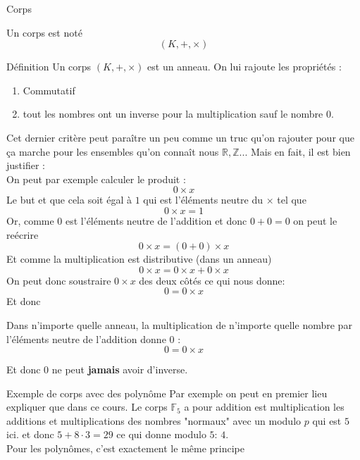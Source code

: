 \begin{parag}{Corps}
    \begin{definition}
        Un corps est noté
    \[(K, +, \times)\]
    \end{definition}
    \begin{subparag}{Définition}
        Un corps $(K, +, \times)$ est un anneau. On lui rajoute les propriétés :
        \begin{enumerate}
            \item Commutatif
            \item tout les nombres ont un inverse pour la multiplication sauf le nombre $0$.
        \end{enumerate}
        Cet dernier critère peut paraître un peu comme un truc qu'on rajouter pour que ça marche pour les ensembles qu'on connaît nous $\mathbb{R}, \mathbb{Z}...$ Mais en fait, il est bien justifier :
        \\
        On peut par exemple calculer le produit : 
        \[ 0 \times x\]
        Le but et que cela soit égal à $1$ qui est l'éléments neutre du $\times$ tel  que
        \[0 \times x = 1\]
        Or, comme $0$ est l'éléments neutre de l'addition et donc $0 + 0 = 0$ on peut le reécrire 
        \[0 \times x = (0 + 0) \times x\]
        Et comme la multiplication est distributive (dans un anneau)
        \[0 \times x = 0\times x + 0\times x\]
        On peut donc soustraire $0 \times x$ des deux côtés ce qui nous donne:
        \[0 = 0 \times x\]
        Et donc
        \begin{lemme}
            Dans n'importe quelle anneau, la multiplication de n'importe quelle nombre par l'éléments neutre de l'addition donne $0$ : 
            \[0 = 0 \times x\]
            
        \end{lemme}
        Et donc $0$ ne peut \textbf{jamais} avoir d'inverse.

    \end{subparag}
\end{parag}
\begin{parag}{Exemple de corps avec des polynôme}
    Par exemple on peut en premier lieu expliquer que dans ce cours. Le corps $\mathbb{F}_5$ a pour addition est multiplication les additions et multiplications des nombres "normaux" avec un modulo $p$ qui est $5$ ici. et donc $5 + 8 \cdot 3= 29$ ce qui donne modulo $5$: $4$.
    \\
    Pour les polynômes, c'est exactement le même principe
\end{parag}

